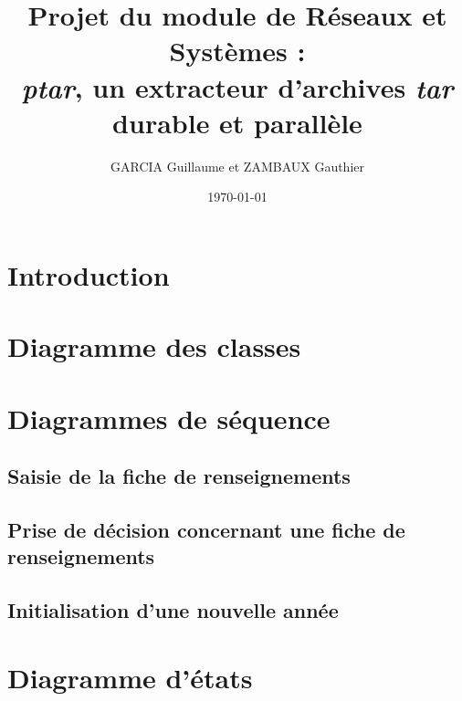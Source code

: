 \documentclass[11pt, a4paper]{report}
\title{Projet du module de Réseaux et Systèmes :\\ \textit{ptar}, un extracteur d'archives \textit{tar} durable et parallèle}
\author{GARCIA  Guillaume et ZAMBAUX Gauthier}
\date{\today}
\begin{document}
\maketitle


\chapter*{Introduction}
\hspace{1cm}\vspace{0.2cm}

\hspace{0.6cm}\vspace{0.2cm}


\chapter*{Diagramme des classes}


\chapter*{Diagrammes de séquence}

\section*{Saisie de la fiche de renseignements}


\section*{Prise de décision concernant une fiche de renseignements}

 
\section*{Initialisation d'une nouvelle année}


\chapter*{Diagramme d'états}
\end{document}
